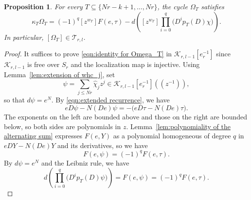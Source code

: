 \documentclass[reqno]{amsart}
\newtheorem{prop}[thm]{Proposition}
\theoremstyle{definition}
\theoremstyle{remark}
\newcommand{\cat}{\mathcal{T}}
\newcommand{\cak}{\mathcal{K}}
\newcommand{\whc}{\widehat{\chi}}
\begin{document}
\begin{prop}\label{prop:Omega_T generated by tails}
For every $T\subseteq\{Nr-k+1,\dots,Nr\}$, the cycle $\Omega_T$ satisfies
\begin{equation}\label{eqn:identity for Omega_T}
\kappa_T\Omega_T=(-1)^q[z^{w_T}]F(e,\tau)-d\left([z^{w_T}]\prod_{i=0}^q\bigl(D^ip_T(D)\chi\bigr)\right).
\end{equation}
In particular, $[\Omega_T]\in\cat_{r,l}$.
\end{prop}

\begin{proof}
It suffices to prove \eqref{eqn:identity for Omega_T} in $\cak_{r,l-1}[e_r^{-1}]$ since $\cak_{r,l-1}$ is free over $S_r$ and the localization map is injective. Using Lemma~\ref{lem:extension of whc_j}, set \[\psi=\sum_{j\le Nr}\whc_jz^j\in\cak_{r,l-1}[e_r^{-1}]((z^{-1})),\] so that $d\psi=e^N$. By \eqref{eqn:extended recurrence}, we have \[eD\psi-N(De)\psi=-\bigl(eD\tau-N(De)\tau\bigr).\] The exponents on the left are bounded above and those on the right are bounded below, so both sides are polynomials in $z$. Lemma~\ref{lem:polynomiality of the alternating sum} expresses $F(e,Y)$ as a polynomial homogeneous of degree $q$ in $eDY-N(De)Y$ and its derivatives, so we have \[F(e,\psi)=(-1)^qF(e,\tau).\] By $d\psi=e^N$ and the Leibniz rule, we have \begin{equation}\label{eqn:differential of shifted product}d\left(\prod_{i=0}^q\bigl(D^ip_T(D)\psi\bigr)\right)=F(e,\psi)=(-1)^qF(e,\tau).\end{equation}


\end{proof}
\end{document}
